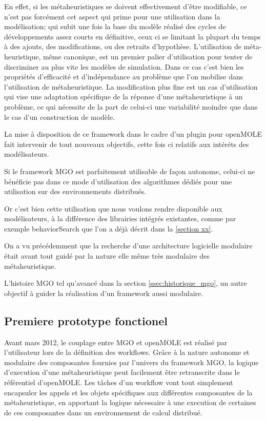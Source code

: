 En effet, si les métaheuristiques se doivent effectivement d'être modifiable, ce n'est pas forcément cet aspect qui prime pour une utilisation dans la modélisation; qui subit une fois la base du modèle réalisé des cycles de développements assez courts en définitive, ceux ci se limitant la plupart du temps à des ajouts, des modifications, ou des retraits d'hypothèse. L'utilisation de méta-heuristique, même canonique, est un premier palier d'utilisation pour tenter de discriminer au plus vite les modèles de simulation. Dans ce cas c'est bien les propriétés d'efficacité et d'indépendance au problème que l'on mobilise dans l'utilisation de métaheuristique. La modification plus fine est un cas d'utilisation qui vise une adaptation spécifique de la réponse d'une métaheuristique à un problème, ce qui nécessite de la part de celui-ci une variabilité moindre que dans le cas d'un construction de modèle.


La mise à disposition de ce framework dans le cadre d'un plugin pour openMOLE fait intervenir de tout nouveaux objectifs, cette fois ci relatifs aux intéréts des modélisateurs.

Si le framework MGO est parfaitement utilisable de façon autonome, celui-ci ne bénéficie pas dans ce mode d'utilisation des algorithmes dédiés pour une utilisation sur des environnements distribués.

Or c'est bien cette utilisation que nous voulons rendre disponible aux modélisateurs, à la différence des librairies intégrés existantes, comme par exemple behaviorSearch que l'on a déjà décrit dans la \ref{section xx}.

On a vu précédemment que la recherche d'une architecture logicielle modulaire était avant tout guidé par la nature elle même très modulaire des métaheuristique.



L'histoire MGO tel qu'avancé dans la section \ref{ssec:historique_mgo}, un autre objectif à guider la réalisation d'un framework aussi modulaire.


\subsection{Premiere prototype fonctionel}
\label{p:prototype_fonctionel}

Avant mars 2012, le couplage entre MGO et openMOLE est réalisé par l'utilisateur lors de la définition des workflows. Grâce à la nature autonome et modulaire des composantes fournies par l'univers du framework MGO, la logique d'execution d'une métaheuristique peut facilement être retranscrite dans le référentiel d'openMOLE. Les tâches d'un workflow vont tout simplement encapsuler les appels et les objets spécifiques aux différentes composantes de la métaheuristique, en apportant la logique nécessaire à une execution de certaines de ces composantes dans un environnement de calcul distribué.

